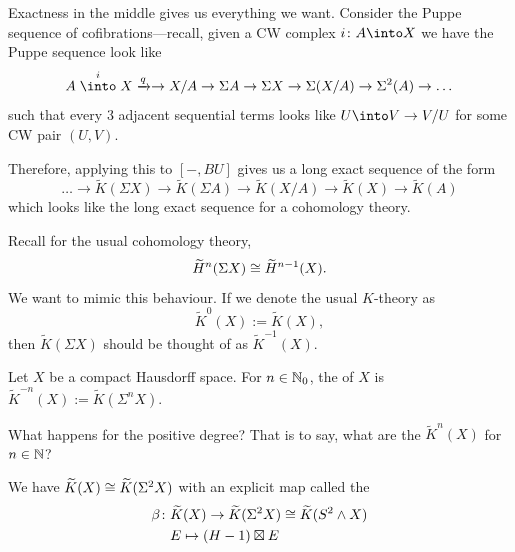 \begin{node}
Exactness in the middle gives us everything we want. Consider the
Puppe sequence of cofibrations---recall, given a CW complex $i\colon A\into X$
we have the Puppe sequence look like
\begin{equation}
A\stackrel{i}{\into}X\xrightarrow{q}\to X/A\to\Sigma A\to\Sigma X\to\Sigma(X/A)\to\Sigma^{2}(A)\to\dots
\end{equation}
such that every 3 adjacent sequential terms looks like $U\into V\to V/U$
for some CW pair $(U,V)$.

Therefore, applying this to $[-,BU]$ gives us a long exact sequence of
the form
\begin{equation}
\dots\to\widetilde{K}(\Sigma X)\to\widetilde{K}(\Sigma A)\to\widetilde{K}(X/A)\to\widetilde{K}(X)\to\widetilde{K}(A)
\end{equation}
which looks like the long exact sequence for a cohomology theory.

Recall for the usual cohomology theory,
\begin{equation}
\widetilde{H}^{n}(\Sigma X)\cong\widetilde{H}^{n-1}(X).
\end{equation}
We want to mimic this behaviour. If we denote the usual $K$-theory as
\begin{equation}
\widetilde{K}^{0}(X):=\widetilde{K}(X),
\end{equation}
then $\widetilde{K}(\Sigma X)$ should be thought of as $\widetilde{K}^{-1}(X)$.
\end{node}

\begin{definition}
Let $X$ be a compact Hausdorff space.
For $n\in\mathbb{N}_{0}$, the  of $X$
is $\widetilde{K}^{-n}(X):=\widetilde{K}(\Sigma^{n}X)$.
\end{definition}

\begin{question}
What happens for the positive degree? That is to say, what are the
$\widetilde{K}^{n}(X)$ for $n\in\mathbb{N}$?
\end{question}

\begin{theorem}
We have $\widetilde{K}(X)\cong\widetilde{K}(\Sigma^{2}X)$ with an
explicit map called the 
\begin{equation}
\begin{split}
\beta\colon&\widetilde{K}(X)\to\widetilde{K}(\Sigma^{2}X)\cong\widetilde{K}(S^{2}\mathbin{\wedge} X)\\
&E\mapsto(H-1)\boxtimes E
\end{split}
\end{equation}
\end{theorem}


